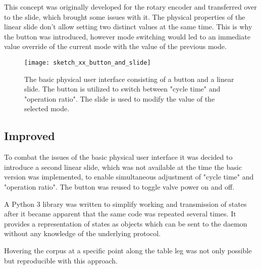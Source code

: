 This concept was originally developed for the rotary encoder and transferred over to the slide, which brought some issues with it. The physical properties of the linear slide don't allow setting two distinct values at the same time. This is why the button was introduced, however mode switching would led to an immediate value override of the current mode with the value of the previous mode.

\begin{figure}[h]
\centering

\texttt{[image: sketch\_xx\_button\_and\_slide]}


\caption{The basic physical user interface consisting of a button and a linear slide. The button is utilized to switch between "cycle time" and "operation ratio". The slide is used to modify the value of the selected mode.}
\end{figure}

\subsection{Improved}
To combat the issues of the basic physical user interface it was decided to introduce a second linear slide, which was not available at the time the basic version was implemented, to enable simultaneous adjustment of "cycle time" and "operation ratio". The button was reused to toggle valve power on and off.

A Python 3 library was written to simplify working and transmission of states after it became apparent that the same code was repeated several times. It provides a representation of states as objects which can be sent to the daemon without any knowledge of the underlying protocol. 

Hovering the corpus at a specific point along the table leg was not only possible but reproducible with this approach.  